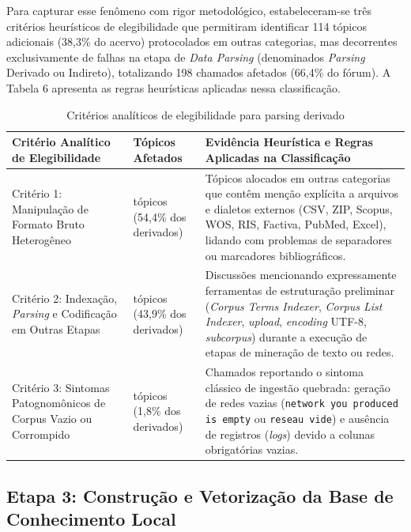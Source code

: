 \documentclass[
	oneside,
	a4paper,
	12pt,
	chapter=TITLE,
	section=TITLE,
	english,
	brazilian
]{abntex2}
\begin{document}
Para capturar esse fenômeno com rigor metodológico, estabeleceram-se três critérios heurísticos de elegibilidade que permitiram identificar 114 tópicos adicionais (38,3\% do acervo) protocolados em outras categorias, mas decorrentes exclusivamente de falhas na etapa de \textit{Data Parsing} (denominados \textit{Parsing} Derivado ou Indireto), totalizando 198 chamados afetados (66,4\% do fórum). A Tabela 6 apresenta as regras heurísticas aplicadas nessa classificação.

\begin{table}[htb]
  \caption{Critérios analíticos de elegibilidade para parsing derivado}
  \label{tab:tabela_6}
  \centering
  \small
  \setlength{\tabcolsep}{4pt}
  \begin{tabularx}{\textwidth}{|>{\raggedright\arraybackslash}p{4.2cm}|>{\centering\arraybackslash}p{3.0cm}|>{\raggedright\arraybackslash}X|}
    \hline
    \textbf{Critério Analítico de Elegibilidade} & \textbf{Tópicos Afetados} & \textbf{Evidência Heurística e Regras Aplicadas na Classificação} \\ \hline
    Critério 1: Manipulação de Formato Bruto Heterogêneo & 62 tópicos (54,4\% dos derivados) & Tópicos alocados em outras categorias que contêm menção explícita a arquivos e dialetos externos (CSV, ZIP, Scopus, WOS, RIS, Factiva, PubMed, Excel), lidando com problemas de separadores ou marcadores bibliográficos. \\ \hline
    Critério 2: Indexação, \textit{Parsing} e Codificação em Outras Etapas & 50 tópicos (43,9\% dos derivados) & Discussões mencionando expressamente ferramentas de estruturação preliminar (\textit{Corpus Terms Indexer}, \textit{Corpus List Indexer}, \textit{upload}, \textit{encoding} UTF-8, \textit{subcorpus}) durante a execução de etapas de mineração de texto ou redes. \\ \hline
    Critério 3: Sintomas Patognomônicos de Corpus Vazio ou Corrompido & 2 tópicos (1,8\% dos derivados) & Chamados reportando o sintoma clássico de ingestão quebrada: geração de redes vazias (\texttt{network you produced is empty} ou \texttt{reseau vide}) e ausência de registros (\textit{logs}) devido a colunas obrigatórias vazias. \\ \hline
  \end{tabularx}
\end{table}
\FloatBarrier


\FloatBarrier
\subsection{Etapa 3: Construção e Vetorização da Base de Conhecimento Local}\label{sec:etapa_3_construcao_e_vetorizacao_da_base}
\end{document}
